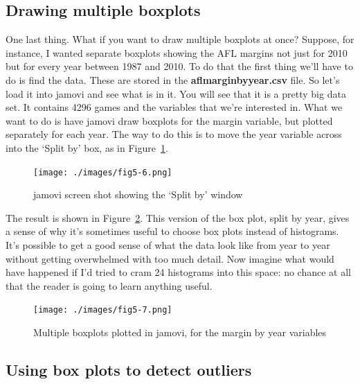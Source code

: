 \documentclass[
  letterpaper,
]{book}
\begin{document}
\hypertarget{drawing-multiple-boxplots}{%
\subsection{Drawing multiple boxplots}\label{drawing-multiple-boxplots}}

One last thing. What if you want to draw multiple boxplots at once?
Suppose, for instance, I wanted separate boxplots showing the AFL
margins not just for 2010 but for every year between 1987 and 2010. To
do that the first thing we'll have to do is find the data. These are
stored in the \textbf{aflmarginbyyear.csv} file. So let's load it into
jamovi and see what is in it. You will see that it is a pretty big data
set. It contains 4296 games and the variables that we're interested in.
What we want to do is have jamovi draw boxplots for the margin variable,
but plotted separately for each year. The way to do this is to move the
year variable across into the `Split by' box, as in
Figure~\ref{fig-fig5-6}.

\begin{figure}

\texttt{[image: ./images/fig5-6.png]} \hfill{}

\caption{\label{fig-fig5-6}jamovi screen shot showing the `Split by'
window}

\end{figure}

The result is shown in Figure~\ref{fig-fig5-7}. This version of the box
plot, split by year, gives a sense of why it's sometimes useful to
choose box plots instead of histograms. It's possible to get a good
sense of what the data look like from year to year without getting
overwhelmed with too much detail. Now imagine what would have happened
if I'd tried to cram 24 histograms into this space: no chance at all
that the reader is going to learn anything useful.

\begin{figure}

\texttt{[image: ./images/fig5-7.png]} \hfill{}

\caption{\label{fig-fig5-7}Multiple boxplots plotted in jamovi, for the
margin by year variables}

\end{figure}

\hypertarget{sec-Using-box-plots-to-detect-outliers}{%
\subsection{Using box plots to detect
outliers}\label{sec-Using-box-plots-to-detect-outliers}}
\end{document}
